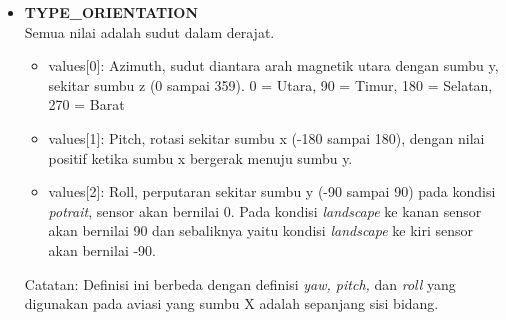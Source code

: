 \begin{itemize}
\item \textbf{TYPE\_ORIENTATION}\\
Semua nilai adalah sudut dalam derajat.
\begin{itemize}
	\item values[0]: Azimuth, sudut diantara arah magnetik utara dengan sumbu y, sekitar sumbu z (0 sampai 359). 0 = Utara, 90 = Timur, 180 = Selatan, 270 = Barat
	\item values[1]: Pitch, rotasi sekitar sumbu x (-180 sampai 180), dengan nilai positif ketika sumbu x bergerak menuju sumbu y.
	\item values[2]: Roll, perputaran sekitar sumbu y (-90 sampai 90) pada kondisi \textit{potrait}, sensor akan bernilai 0. Pada kondisi \textit{landscape} ke kanan sensor akan bernilai 90 dan sebaliknya yaitu kondisi \textit{landscape} ke kiri sensor akan bernilai -90.
\end{itemize}

Catatan: Definisi ini berbeda dengan definisi \textit{yaw, pitch,} dan \textit{roll} yang digunakan pada aviasi yang sumbu X adalah sepanjang sisi bidang.


\end{itemize}
